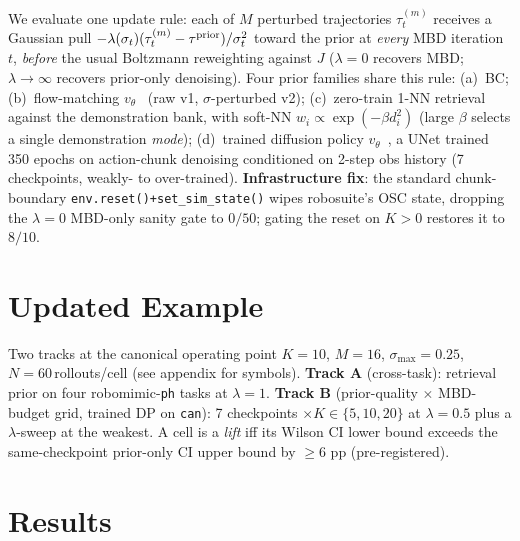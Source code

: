 \documentclass[letterpaper, 10 pt, conference]{ieeeconf}
\begin{document}
We evaluate one update rule: each of $M$ perturbed trajectories
$\tau_t^{(m)}$ receives a Gaussian pull
$-\lambda(\sigma_t)(\tau_t^{(m)}-\tau^{\rm prior})/\sigma_t^2$
toward the prior at \emph{every} MBD iteration $t$, \emph{before}
the usual Boltzmann reweighting against $J$ ($\lambda\!=\!0$
recovers MBD; $\lambda\!\to\!\infty$ recovers prior-only
denoising). Four prior families share this rule: (a)~BC; (b)~flow-matching
$v_\theta$~\cite{rectflow} (raw v1, $\sigma$-perturbed v2);
(c)~zero-train 1-NN retrieval against the demonstration bank,
with soft-NN $w_i\!\propto\!\exp(-\beta d_i^2)$ (large $\beta$
selects a single demonstration \emph{mode}); (d)~trained
diffusion policy $v_\theta$~\cite{dp}, a UNet trained 350
epochs on action-chunk denoising conditioned on 2-step obs
history (7 checkpoints, weakly- to over-trained).
\textbf{Infrastructure fix}: the standard chunk-boundary
\texttt{env.reset()+set\_sim\_state()} wipes robosuite's OSC
state, dropping the $\lambda\!=\!0$ MBD-only sanity gate to
$0/50$; gating the reset on $K\!>\!0$ restores it to $8/10$.

\section{Updated Example}

Two tracks at the canonical operating point $K\!=\!10$,
$M\!=\!16$, $\sigma_{\max}\!=\!0.25$, $N\!=\!60$\,rollouts/cell
(see appendix for symbols). \textbf{Track A} (cross-task):
retrieval prior on four robomimic-\texttt{ph} tasks at
$\lambda\!=\!1$. \textbf{Track B} (prior-quality $\times$
MBD-budget grid, trained DP on \texttt{can}): 7 checkpoints
$\times K\!\in\!\{5,10,20\}$ at $\lambda\!=\!0.5$ plus a
$\lambda$-sweep at the weakest. A cell is a \emph{lift} iff
its Wilson CI lower bound exceeds the same-checkpoint
prior-only CI upper bound by $\geq 6$ pp (pre-registered).

\section{Results}
\end{document}
